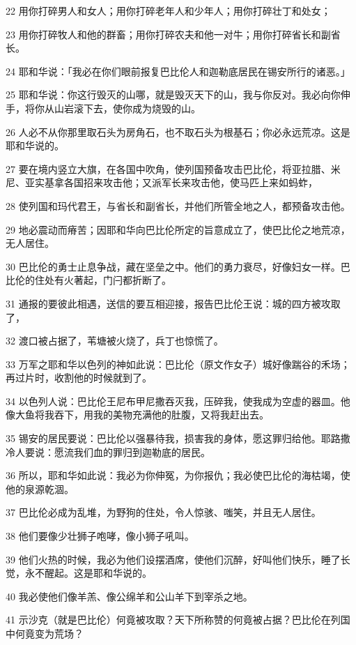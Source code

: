 \par 22 用你打碎男人和女人；用你打碎老年人和少年人；用你打碎壮丁和处女；
\par 23 用你打碎牧人和他的群畜；用你打碎农夫和他一对牛；用你打碎省长和副省长。
\par 24 耶和华说：「我必在你们眼前报复巴比伦人和迦勒底居民在锡安所行的诸恶。」
\par 25 耶和华说：你这行毁灭的山哪，就是毁灭天下的山，我与你反对。我必向你伸手，将你从山岩滚下去，使你成为烧毁的山。
\par 26 人必不从你那里取石头为房角石，也不取石头为根基石；你必永远荒凉。这是耶和华说的。
\par 27 要在境内竖立大旗，在各国中吹角，使列国预备攻击巴比伦，将亚拉腊、米尼、亚实基拿各国招来攻击他；又派军长来攻击他，使马匹上来如蚂蚱，
\par 28 使列国和玛代君王，与省长和副省长，并他们所管全地之人，都预备攻击他。
\par 29 地必震动而瘠苦；因耶和华向巴比伦所定的旨意成立了，使巴比伦之地荒凉，无人居住。
\par 30 巴比伦的勇士止息争战，藏在坚垒之中。他们的勇力衰尽，好像妇女一样。巴比伦的住处有火著起，门闩都折断了。
\par 31 通报的要彼此相遇，送信的要互相迎接，报告巴比伦王说：城的四方被攻取了，
\par 32 渡口被占据了，苇塘被火烧了，兵丁也惊慌了。
\par 33 万军之耶和华以色列的神如此说：巴比伦（原文作女子）城好像踹谷的禾场；再过片时，收割他的时候就到了。
\par 34 以色列人说：巴比伦王尼布甲尼撒吞灭我，压碎我，使我成为空虚的器皿。他像大鱼将我吞下，用我的美物充满他的肚腹，又将我赶出去。
\par 35 锡安的居民要说：巴比伦以强暴待我，损害我的身体，愿这罪归给他。耶路撒冷人要说：愿流我们血的罪归到迦勒底的居民。
\par 36 所以，耶和华如此说：我必为你伸冤，为你报仇；我必使巴比伦的海枯竭，使他的泉源乾涸。
\par 37 巴比伦必成为乱堆，为野狗的住处，令人惊骇、嗤笑，并且无人居住。
\par 38 他们要像少壮狮子咆哮，像小狮子吼叫。
\par 39 他们火热的时候，我必为他们设摆酒席，使他们沉醉，好叫他们快乐，睡了长觉，永不醒起。这是耶和华说的。
\par 40 我必使他们像羊羔、像公绵羊和公山羊下到宰杀之地。
\par 41 示沙克（就是巴比伦）何竟被攻取？天下所称赞的何竟被占据？巴比伦在列国中何竟变为荒场？
